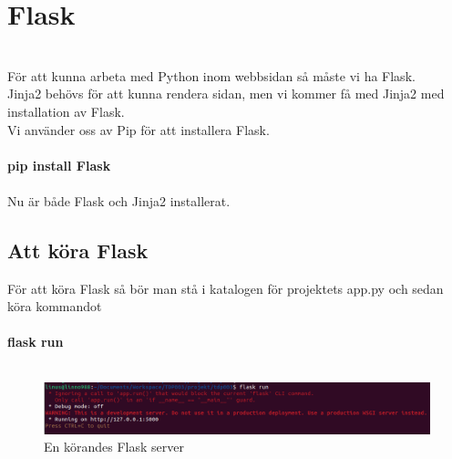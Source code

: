 \documentclass{TDP003mall}
\begin{document}
\section{Flask}\\
För att kunna arbeta med Python inom webbsidan så måste vi ha Flask.\\
Jinja2 behövs för att kunna rendera sidan, men vi kommer få med Jinja2 med installation av Flask.\\ 
Vi använder oss av Pip för att installera Flask.\\\\
\textbf{pip install Flask}\\\\
Nu är både Flask och Jinja2 installerat.\\
\subsection{Att köra Flask}
För att köra Flask så bör man stå i katalogen för projektets app.py och sedan köra kommandot\\\\
\textbf{flask run}\\\\
\begin{figure}[h]
  \centering
  \includegraphics[scale=0.5]{flask_run}
  \caption{\label{fig:The-caption} En körandes Flask server}
\end{figure}
\end{document}
